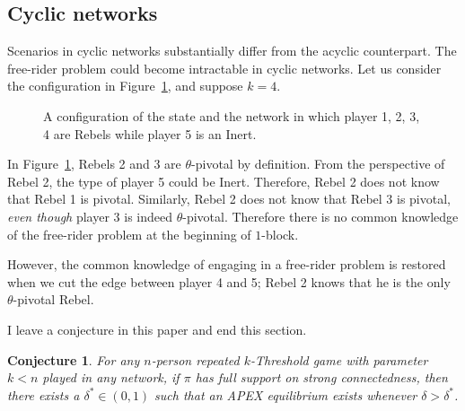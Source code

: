 \documentclass[12pt,letter]{article}
\newtheorem{conjecture}{Conjecture}[section]
\theoremstyle{definition}
\theoremstyle{definition}
\theoremstyle{remark}
\theoremstyle{claim}
\begin{document}
\subsection{Cyclic networks}
\label{sec:cyclic}


Scenarios in cyclic networks substantially differ from the acyclic counterpart. The free-rider problem could become intractable in cyclic networks. Let us consider the configuration in Figure~\ref{fig:cyclic_network}, and suppose $k=4$.

\begin{figure}[!h]

\begin{center}
\end{center}
\caption{A configuration of the state and the network in which player 1, 2, 3, 4 are Rebels while player 5 is an Inert.}
\label{fig:cyclic_network}
\end{figure}

In Figure~\ref{fig:cyclic_network}, Rebels 2 and 3 are $\theta$-pivotal by definition. From the perspective of Rebel 2, the type of player 5 could be Inert. Therefore, Rebel 2 does not know that Rebel 1 is pivotal. Similarly, Rebel 2 does not know that Rebel 3 is pivotal, \textit{even though} player 3 is indeed $\theta$-pivotal. Therefore there is no common knowledge of the free-rider problem at the beginning of $1$-block. 

However, the common knowledge of engaging in a free-rider problem is restored when we cut the edge between player 4 and 5; Rebel 2 knows that he is the only $\theta$-pivotal Rebel.

I leave a conjecture in this paper and end this section.

\begin{conjecture}
For any $n$-person repeated $k$-Threshold game with parameter $ k < n$ played in any network,
if $\pi$ has full support on strong connectedness, then there exists a $\delta^{*}\in (0,1)$ such that an APEX equilibrium exists whenever $\delta>\delta^{*}$.
\end{conjecture}
%
%
%
\end{document}
